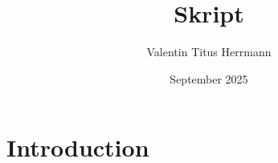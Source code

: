 \documentclass{article}
\title{Skript}
\author{Valentin Titus Herrmann }
\date{September 2025}
\begin{document}
\maketitle

\section{Introduction}
\end{document}
